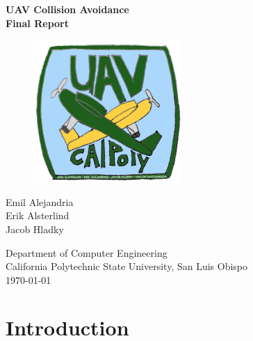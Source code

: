 \documentclass[12pt]{article}
\begin{document}
\begin{titlepage}
  \begin{center}
    \vspace*{1cm}
    \Huge{\textbf{
        UAV Collision Avoidance\\
        Final Report
    }}

    \vspace*{1.5cm}

    \begin{figure}[ht!]
      \centering
      \includegraphics[width=0.5\textwidth]{logo.png}
    \end{figure}

    \vfill
    \large{
      Emil Alejandria\\
      Erik Alsterlind\\
      Jacob Hladky\\
    }

    \vspace{1cm}

    \large{
      Department of Computer Engineering\\
      California Polytechnic State University, San Luis Obispo\\
      \today
    }

  \end{center}
\end{titlepage}


\tableofcontents
\clearpage


\section{Introduction}
\end{document}
